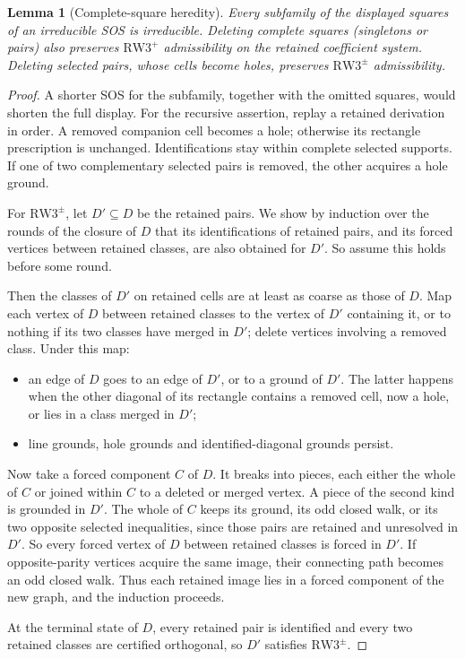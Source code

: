 \documentclass[11pt,a4paper]{article}
\newtheorem{lemma}[theorem]{Lemma}
\theoremstyle{definition}
\newcommand{\RW}{\mathrm{RW3}^{+}}
\newcommand{\SG}{\mathrm{RW3}^{\pm}}
\begin{document}
\begin{lemma}[Complete-square heredity]\label{lem:heredity}
Every subfamily of the displayed squares of an irreducible SOS is
irreducible. Deleting complete squares (singletons or pairs) also preserves $\RW$
admissibility on the retained coefficient system. Deleting selected pairs,
whose cells become holes, preserves $\SG$ admissibility.
\end{lemma}
\begin{proof}
A shorter SOS for the subfamily, together with the omitted squares,
would shorten the full display. For the recursive assertion, replay a
retained derivation in order. A removed companion cell becomes a hole;
otherwise its rectangle prescription is unchanged. Identifications stay
within complete selected supports. If one of two complementary selected
pairs is removed, the other acquires a hole ground.

For $\SG$, let $D'\subseteq D$ be the retained pairs. We show by induction
over the rounds of the closure of $D$ that its identifications of retained
pairs, and its forced vertices between retained classes, are also obtained
for $D'$. So assume this holds before some round.

Then the classes of $D'$ on retained cells are at least as coarse as those
of $D$. Map each vertex of $D$ between retained classes to the vertex of
$D'$ containing it, or to nothing if its two classes have merged in $D'$;
delete vertices involving a removed class. Under this map:
\begin{itemize}
\item an edge of $D$ goes to an edge of $D'$, or to a ground of $D'$. The
      latter happens when the other diagonal of its rectangle contains a
      removed cell, now a hole, or lies in a class merged in $D'$;
\item line grounds, hole grounds and identified-diagonal grounds persist.
\end{itemize}

Now take a forced component $C$ of $D$. It breaks into pieces, each
either the whole of $C$ or joined within $C$ to a deleted or merged
vertex. A piece of the second kind is grounded in $D'$. The whole of $C$
keeps its ground, its odd closed walk, or its two opposite selected
inequalities, since those pairs are retained and unresolved in $D'$. So
every forced vertex of $D$ between retained classes is forced in $D'$.
If opposite-parity vertices acquire the same image, their connecting
path becomes an odd closed walk. Thus each retained image lies in a
forced component of the new graph, and the induction proceeds.

At the terminal state of $D$, every retained pair is identified and every
two retained classes are certified orthogonal, so $D'$ satisfies $\SG$.
\end{proof}
\end{document}
